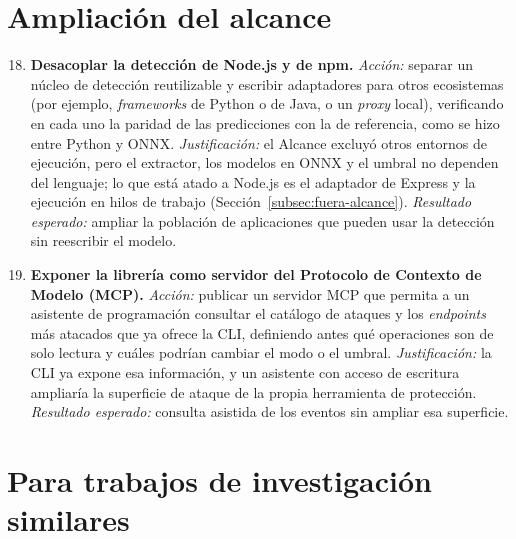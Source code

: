 \section{Ampliación del alcance}

\begin{enumerate}
    \setcounter{enumi}{17}
    \item \textbf{Desacoplar la detección de Node.js y de npm.} \textit{Acción:} separar un
    núcleo de detección reutilizable y escribir adaptadores para otros ecosistemas (por ejemplo,
    \textit{frameworks} de Python o de Java, o un \textit{proxy} local), verificando en cada uno la
    paridad de las predicciones con la de referencia, como se hizo entre Python y ONNX.
    \textit{Justificación:} el Alcance excluyó otros entornos de ejecución, pero el extractor, los
    modelos en ONNX y el umbral no dependen del lenguaje; lo que está atado a Node.js es el
    adaptador de Express y la ejecución en hilos de trabajo (Sección~\ref{subsec:fuera-alcance}).
    \textit{Resultado esperado:} ampliar la población de aplicaciones que pueden usar la detección
    sin reescribir el modelo.

    \item \textbf{Exponer la librería como servidor del Protocolo de Contexto de Modelo (MCP).}
    \textit{Acción:} publicar un servidor MCP que permita a un asistente de programación consultar
    el catálogo de ataques y los \textit{endpoints} más atacados que ya ofrece la CLI, definiendo
    antes qué operaciones son de solo lectura y cuáles podrían cambiar el modo o el umbral.
    \textit{Justificación:} la CLI ya expone esa información, y un asistente con acceso de
    escritura ampliaría la superficie de ataque de la propia herramienta de protección.
    \textit{Resultado esperado:} consulta asistida de los eventos sin ampliar esa superficie.
\end{enumerate}

\section{Para trabajos de investigación similares}

